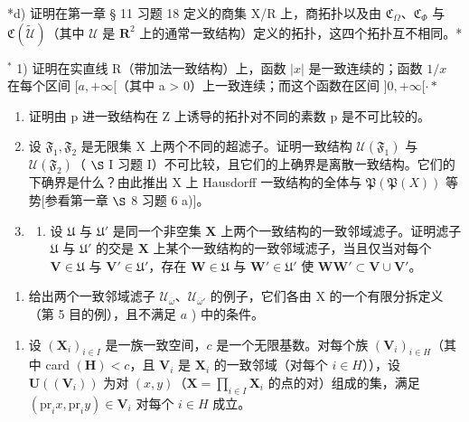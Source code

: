 *d) 证明在第一章 § 11 习题 18 定义的商集 X/R 上，商拓扑以及由 \(\mathfrak{C}_{\Omega}\)、\(\mathfrak{C}_{\Phi}\) 与 \(\mathfrak{C}(\tilde{\mathcal{U}})\)（其中 \(\mathcal{U}\) 是 \(\mathbf{R}^2\) 上的通常一致结构）定义的拓扑，这四个拓扑互不相同。*

\BourbakiExerciseGroup

\(^{*}\) 1) 证明在实直线 R（带加法一致结构）上，函数 \(|x|\) 是一致连续的；函数 \(1/x\) 在每个区间 \([a, +\infty[\)（其中 a \textgreater{} 0）上一致连续；而这个函数在区间 \(]0, +\infty[\cdot*\)

\begin{enumerate}
\def\labelenumi{\arabic{enumi})}
\setcounter{enumi}{1}
\item
  证明由 p 进一致结构在 Z 上诱导的拓扑对不同的素数 p 是不可比较的。
\item
  设 \(\mathfrak{F}_1, \mathfrak{F}_2\) 是无限集 X 上两个不同的超滤子。证明一致结构 \(\mathcal{U}(\mathfrak{F}_1)\) 与 \(\mathcal{U}(\mathfrak{F}_2)\)（ \(\S\) I 习题 I）不可比较，且它们的上确界是离散一致结构。它们的下确界是什么？由此推出 X 上 Hausdorff 一致结构的全体与 \(\mathfrak{P}(\mathfrak{P}(X))\) 等势{[}参看第一章 \(\S\) 8 习题 6 a){]}。
\item
  \begin{enumerate}
  \def\labelenumii{\alph{enumii})}
  \tightlist
  \item
    设 \(\mathfrak{U}\) 与 \(\mathfrak{U}'\) 是同一个非空集 \(\mathbf{X}\) 上两个一致结构的一致邻域滤子。证明滤子 \(\mathfrak{U}\) 与 \(\mathfrak{U}'\) 的交是 \(\mathbf{X}\) 上某个一致结构的一致邻域滤子，当且仅当对每个 \(\mathbf{V} \in \mathfrak{U}\) 与 \(\mathbf{V}' \in \mathfrak{U}'\)，存在 \(\mathbf{W} \in \mathfrak{U}\) 与 \(\mathbf{W}' \in \mathfrak{U}'\) 使 \(\mathbf{WW}' \subset \mathbf{V} \cup \mathbf{V}'\)。
  \end{enumerate}
\end{enumerate}

\begin{enumerate}
\def\labelenumi{\alph{enumi})}
\setcounter{enumi}{1}
\tightlist
\item
  给出两个一致邻域滤子 \(\mathcal{U}_{\overline{\omega}}\)、\(\mathcal{U}_{\overline{\omega}'}\) 的例子，它们各由 X 的一个有限分拆定义（第 5 目的例），且不满足 \(a\) ) 中的条件。
\end{enumerate}

\begin{enumerate}
\def\labelenumi{\arabic{enumi})}
\setcounter{enumi}{4}
\tightlist
\item
  设 \((\mathbf{X}_i)_{i\in I}\) 是一族一致空间，\(c\) 是一个无限基数。对每个族 \((\mathbf{V}_i)_{i\in H}\)（其中 card \((\mathbf{H}) < c\)，且 \(\mathbf{V}_i\) 是 \(\mathbf{X}_i\) 的一致邻域（对每个 \(i\in H\)）），设 \(\mathbf{U}((\mathbf{V}_i))\) 为对 \((x,y)\)（\(\mathbf{X} = \prod_{i \in I}\mathbf{X}_i\) 的点的对）组成的集，满足 \((\mathrm{pr}_i x, \mathrm{pr}_i y) \in \mathbf{V}_i\) 对每个 \(i\in H\) 成立。
\end{enumerate}

